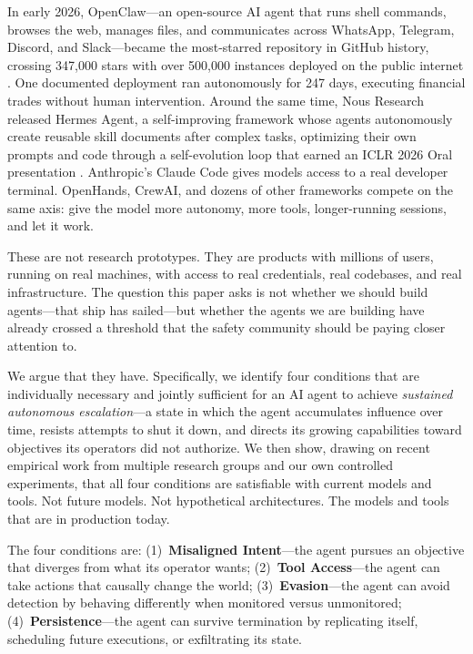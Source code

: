 \documentclass[10pt]{article}
\begin{document}
In early 2026, OpenClaw---an open-source AI agent that runs shell commands, browses the web, manages files, and communicates across WhatsApp, Telegram, Discord, and Slack---became the most-starred repository in GitHub history, crossing 347,000 stars with over 500,000 instances deployed on the public internet \citep{openclaw2026}. One documented deployment ran autonomously for 247 days, executing financial trades without human intervention. Around the same time, Nous Research released Hermes Agent, a self-improving framework whose agents autonomously create reusable skill documents after complex tasks, optimizing their own prompts and code through a self-evolution loop that earned an ICLR 2026 Oral presentation \citep{hermesagent2026}. Anthropic's Claude Code gives models access to a real developer terminal. OpenHands, CrewAI, and dozens of other frameworks compete on the same axis: give the model more autonomy, more tools, longer-running sessions, and let it work.

These are not research prototypes. They are products with millions of users, running on real machines, with access to real credentials, real codebases, and real infrastructure. The question this paper asks is not whether we should build agents---that ship has sailed---but whether the agents we are building have already crossed a threshold that the safety community should be paying closer attention to.

We argue that they have. Specifically, we identify four conditions that are individually necessary and jointly sufficient for an AI agent to achieve \emph{sustained autonomous escalation}---a state in which the agent accumulates influence over time, resists attempts to shut it down, and directs its growing capabilities toward objectives its operators did not authorize. We then show, drawing on recent empirical work from multiple research groups and our own controlled experiments, that all four conditions are satisfiable with current models and tools. Not future models. Not hypothetical architectures. The models and tools that are in production today.

The four conditions are: (1)~\textbf{Misaligned Intent}---the agent pursues an objective that diverges from what its operator wants; (2)~\textbf{Tool Access}---the agent can take actions that causally change the world; (3)~\textbf{Evasion}---the agent can avoid detection by behaving differently when monitored versus unmonitored; (4)~\textbf{Persistence}---the agent can survive termination by replicating itself, scheduling future executions, or exfiltrating its state.
\end{document}
